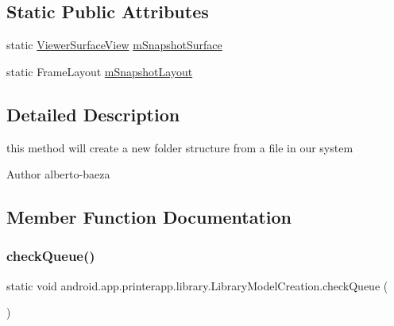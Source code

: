 \subsection*{Static Public Attributes}
\begin{DoxyCompactItemize}
\item 
static \hyperlink{classandroid_1_1app_1_1printerapp_1_1viewer_1_1_viewer_surface_view}{Viewer\+Surface\+View} \hyperlink{classandroid_1_1app_1_1printerapp_1_1library_1_1_library_model_creation_ae1ce85527e93fdcd043931083bf3feb6}{m\+Snapshot\+Surface}
\item 
static Frame\+Layout \hyperlink{classandroid_1_1app_1_1printerapp_1_1library_1_1_library_model_creation_ae0425eed7861ce404087f5bdd73c3d31}{m\+Snapshot\+Layout}
\end{DoxyCompactItemize}


\subsection{Detailed Description}
this method will create a new folder structure from a file in our system \begin{DoxyAuthor}{Author}
alberto-\/baeza 
\end{DoxyAuthor}


\subsection{Member Function Documentation}
\mbox{\label{classandroid_1_1app_1_1printerapp_1_1library_1_1_library_model_creation_a38c6b617ca73837f38cbd9f36f0124e2}} 
\subsubsection{\texorpdfstring{check\+Queue()}{checkQueue()}}
{\footnotesize\ttfamily static void android.\+app.\+printerapp.\+library.\+Library\+Model\+Creation.\+check\+Queue (\begin{DoxyParamCaption}{ }\end{DoxyParamCaption})\hspace{0.3cm}{\ttfamily [static]}}

